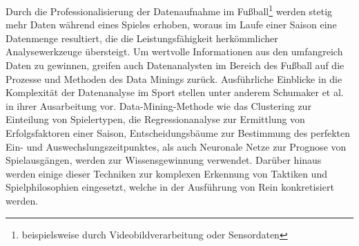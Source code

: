 Durch die Professionalisierung der Datenaufnahme im Fußball\footnote{beispielsweise durch Videobildverarbeitung oder Sensordaten} werden stetig mehr Daten während eines Spieles erhoben, woraus im Laufe einer Saison eine Datenmenge resultiert, die die Leistungsfähigkeit herkömmlicher Analysewerkzeuge übersteigt. Um wertvolle Informationen aus den umfangreich Daten zu gewinnen, greifen auch Datenanalysten im Bereich des Fußball auf die Prozesse und Methoden des Data Minings zurück. Ausführliche Einblicke in die Komplexität der Datenanalyse im Sport stellen unter anderem Schumaker et al. in ihrer Ausarbeitung vor. Data-Mining-Methode wie das Clustering zur Einteilung von Spielertypen, die Regressionanalyse zur Ermittlung von Erfolgsfaktoren einer Saison, Entscheidungsbäume zur Bestimmung des perfekten Ein- und Auswechslungszeitpunktes, als auch Neuronale Netze zur Prognose von Spielausgängen, werden zur Wissensgewinnung verwendet. Darüber hinaus werden einige dieser Techniken zur komplexen Erkennung von Taktiken und Spielphilosophien eingesetzt, welche in der Ausführung von Rein konkretisiert werden.



